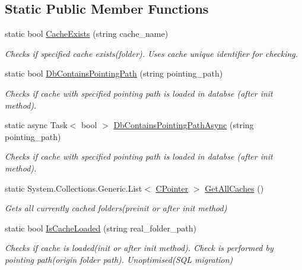 \subsection*{Static Public Member Functions}
\begin{DoxyCompactItemize}
\item 
static bool \mbox{\hyperlink{classOSML_1_1Cache_1_1CacheDataHelper_ad34c09c5cc41a7a3abf1e8ae52536059}{Cache\+Exists}} (string cache\+\_\+name)
\begin{DoxyCompactList}\small\item\em Checks if specified cache exists(folder). Uses cache unique identifier for checking. \end{DoxyCompactList}\item 
static bool \mbox{\hyperlink{classOSML_1_1Cache_1_1CacheDataHelper_a84f1e547e99fbc5f223786d39c605e83}{Db\+Contains\+Pointing\+Path}} (string pointing\+\_\+path)
\begin{DoxyCompactList}\small\item\em Checks if cache with specified pointing path is loaded in databse (after init method). \end{DoxyCompactList}\item 
static async Task$<$ bool $>$ \mbox{\hyperlink{classOSML_1_1Cache_1_1CacheDataHelper_ae5e19c58ce564389ec25728aad35ffa4}{Db\+Contains\+Pointing\+Path\+Async}} (string pointing\+\_\+path)
\begin{DoxyCompactList}\small\item\em Checks if cache with specified pointing path is loaded in databse (after init method). \end{DoxyCompactList}\item 
static System.\+Collections.\+Generic.\+List$<$ \mbox{\hyperlink{classOSML_1_1Cache_1_1CPointer}{C\+Pointer}} $>$ \mbox{\hyperlink{classOSML_1_1Cache_1_1CacheDataHelper_af88f60164b288507fbd0b457d23271ce}{Get\+All\+Caches}} ()
\begin{DoxyCompactList}\small\item\em Gets all currently cached folders(preinit or after init method) \end{DoxyCompactList}\item 
static bool \mbox{\hyperlink{classOSML_1_1Cache_1_1CacheDataHelper_a27914b5a767dc440dfd4ccf8b68965f9}{Is\+Cache\+Loaded}} (string real\+\_\+folder\+\_\+path)
\begin{DoxyCompactList}\small\item\em Checks if cache is loaded(init or after init method). Check is performed by pointing path(origin folder path). Unoptimised(\+S\+Q\+L migration) \end{DoxyCompactList}\item 

\end{DoxyCompactItemize}
